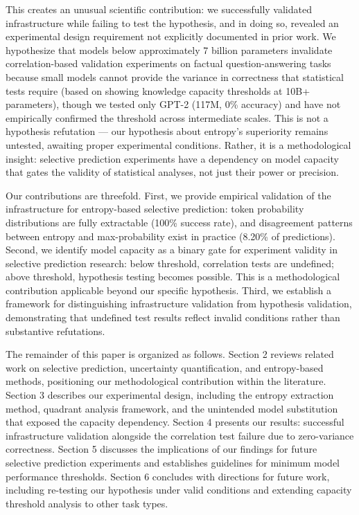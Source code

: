 This creates an unusual scientific contribution: we successfully validated infrastructure while failing to test the hypothesis, and in doing so, revealed an experimental design requirement not explicitly documented in prior work. We hypothesize that models below approximately 7 billion parameters invalidate correlation-based validation experiments on factual question-answering tasks because small models cannot provide the variance in correctness that statistical tests require (based on \citet{Roberts2020} showing knowledge capacity thresholds at 10B+ parameters), though we tested only GPT-2 (117M, 0\% accuracy) and have not empirically confirmed the threshold across intermediate scales. This is not a hypothesis refutation --- our hypothesis about entropy's superiority remains untested, awaiting proper experimental conditions. Rather, it is a methodological insight: selective prediction experiments have a dependency on model capacity that gates the validity of statistical analyses, not just their power or precision.

Our contributions are threefold. First, we provide empirical validation of the infrastructure for entropy-based selective prediction: token probability distributions are fully extractable (100\% success rate), and disagreement patterns between entropy and max-probability exist in practice (8.20\% of predictions). Second, we identify model capacity as a binary gate for experiment validity in selective prediction research: below threshold, correlation tests are undefined; above threshold, hypothesis testing becomes possible. This is a methodological contribution applicable beyond our specific hypothesis. Third, we establish a framework for distinguishing infrastructure validation from hypothesis validation, demonstrating that undefined test results reflect invalid conditions rather than substantive refutations.

The remainder of this paper is organized as follows. Section 2 reviews related work on selective prediction, uncertainty quantification, and entropy-based methods, positioning our methodological contribution within the literature. Section 3 describes our experimental design, including the entropy extraction method, quadrant analysis framework, and the unintended model substitution that exposed the capacity dependency. Section 4 presents our results: successful infrastructure validation alongside the correlation test failure due to zero-variance correctness. Section 5 discusses the implications of our findings for future selective prediction experiments and establishes guidelines for minimum model performance thresholds. Section 6 concludes with directions for future work, including re-testing our hypothesis under valid conditions and extending capacity threshold analysis to other task types.
